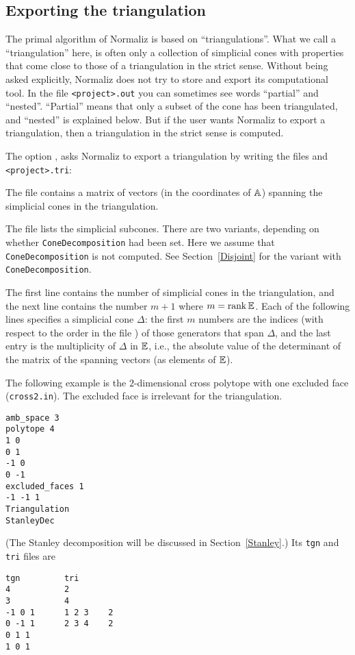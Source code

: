 \subsection{Exporting the triangulation}\label{Triang}

The primal algorithm of Normaliz is based on ``triangulations''. What we call a ``triangulation'' here, is often only a collection of simplicial cones with properties that come close to those of a triangulation in the strict sense. Without being asked explicitly, Normaliz does not try to store and export its computational tool. In the file \verb|<project>.out| you can sometimes see words ``partial'' and ``nested''. ``Partial'' means that only a subset of the cone has been triangulated, and ``nested'' is explained below.
But if the user wants Normaliz to export a triangulation, then a triangulation in the strict sense is computed.

The option ,  asks Normaliz to export a triangulation by writing the files
 and \verb|<project>.tri|:

\begin{itemize}
	
	\itemtt[tgn] The file  contains a matrix of vectors (in the
	coordinates of $\AA$) spanning the simplicial cones in
	the triangulation.
	
	\itemtt[tri]
	The file  lists the simplicial subcones. There are two variants, depending on whether \verb|ConeDecomposition| had been set. Here we assume that \verb|ConeDecomposition| is not computed. See Section~\ref{Disjoint} for the variant with \verb|ConeDecomposition|.
	
	The first line contains the number of simplicial cones
	in the triangulation, and the next line contains the
	number $m+1$ where $m=\rank \EE$. Each of the following
	lines specifies a simplicial cone $\Delta$: the first
	$m$ numbers are the indices (with respect to the order
	in the file ) of those generators that span
	$\Delta$, and the last entry is the multiplicity of
	$\Delta$ in $\EE$, i.e., the absolute value of the
	determinant of the matrix of the spanning vectors (as
	elements of $\EE$).
\end{itemize}

The following example is the $2$-dimensional cross polytope with one excluded face (\verb|cross2.in|). The excluded face is irrelevant for the triangulation.

\begin{Verbatim}
amb_space 3
polytope 4
1 0
0 1
-1 0
0 -1
excluded_faces 1
-1 -1 1
Triangulation
StanleyDec        
\end{Verbatim}
(The Stanley decomposition will be discussed in Section~\ref{Stanley}.)
Its \verb|tgn| and \verb|tri| files are
\begin{Verbatim}
tgn         tri
4           2
3           4
-1 0 1      1 2 3    2
0 -1 1      2 3 4    2
0 1 1       
1 0 1 
\end{Verbatim}

